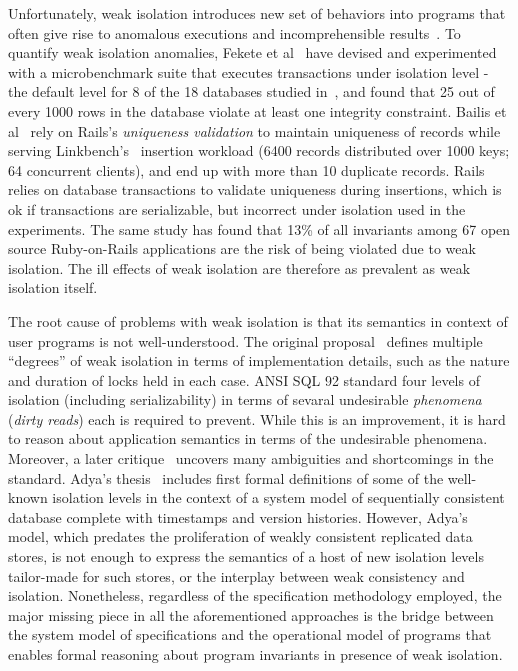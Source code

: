 Unfortunately, weak isolation introduces new set of behaviors into
programs that often give rise to anomalous executions and
incomprehensible results~\cite{pldi15}. To quantify weak isolation
anomalies, Fekete et al~\cite{feketevldb09} have devised and
experimented with a microbenchmark suite that executes transactions
under  isolation level - the default level for 8
of the 18 databases studied in~\cite{bailishotos}, and found that 25
out of every 1000 rows in the database violate at least one integrity
constraint. Bailis et al~\cite{bailisferal} rely on Rails's
\emph{uniqueness validation} to maintain uniqueness of records while
serving Linkbench's~\cite{linkbench} insertion workload (6400 records
distributed over 1000 keys; 64 concurrent clients), and end up with
more than 10 duplicate records. Rails relies on database transactions
to validate uniqueness during insertions, which is ok if transactions
are serializable, but incorrect under  isolation
used in the experiments. The same study has found that 13\% of all
invariants among 67 open source Ruby-on-Rails applications are the
risk of being violated due to weak isolation. The ill effects of weak
isolation are therefore as prevalent as weak isolation itself.

The root cause of problems with weak isolation is that its semantics
in context of user programs is not well-understood. The original
proposal~\cite{gray1976} defines multiple ``degrees'' of weak
isolation in terms of implementation details, such as the nature and
duration of locks held in each case. ANSI SQL 92 standard four levels
of isolation (including serializability) in terms of sevaral
undesirable \emph{phenomena} (\eg \emph{dirty reads}) each is required
to prevent. While this is an improvement, it is hard to reason about
application semantics in terms of the undesirable phenomena. Moreover,
a later critique~\cite{berenson} uncovers many ambiguities and
shortcomings in the standard. Adya's thesis~\cite{adyaphd} includes
first formal definitions of some of the well-known isolation levels in
the context of a system model of sequentially consistent database
complete with timestamps and version histories. However, Adya's model,
which predates the proliferation of weakly consistent replicated data
stores, is not enough to express the semantics of a host of new
isolation levels~\cite{psi,nmsi} tailor-made for such stores, or the
interplay between weak consistency and isolation. Nonetheless,
regardless of the specification methodology employed, the major
missing piece in all the aforementioned approaches is the bridge
between the system model of specifications and the operational model
of programs that enables formal reasoning about program invariants in
presence of weak isolation.

